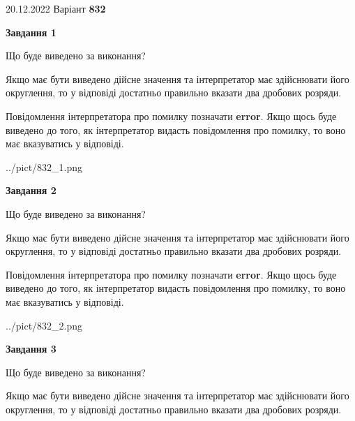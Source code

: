 \documentclass[12pt, ukrainian]{article}
\begin{document}
{20.12.2022 Варіант \No \textbf { 832 }\par}
{
\begin {Large}

{\begin {center}\textbf{Завдання 1}\end {center}}\par
Що буде виведено за виконання? \par

Якщо має бути виведено дійсне значення та інтерпретатор має здійснювати його округлення, 
то у відповіді достатньо правильно вказати два дробових розряди.

Повідомлення інтерпретатора про помилку позначати \textbf{error}.
Якщо щось буде виведено до того, як інтерпретатор видасть повідомлення про помилку, 
то воно має вказуватись у відповіді. \par

\begin{center}
	{../pict/832_1.png}
\end{center}
\newpage

{\begin {center}\textbf{Завдання 2}\end {center}}\par
Що буде виведено за виконання? \par

Якщо має бути виведено дійсне значення та інтерпретатор має здійснювати його округлення, 
то у відповіді достатньо правильно вказати два дробових розряди.

Повідомлення інтерпретатора про помилку позначати \textbf{error}.
Якщо щось буде виведено до того, як інтерпретатор видасть повідомлення про помилку, 
то воно має вказуватись у відповіді. \par

\begin{center}
	{../pict/832_2.png}
\end{center}
\newpage

{\begin {center}\textbf{Завдання 3}\end {center}}\par
Що буде виведено за виконання? \par

Якщо має бути виведено дійсне значення та інтерпретатор має здійснювати його округлення, 
то у відповіді достатньо правильно вказати два дробових розряди.


\end{Large}}
\end{document}
